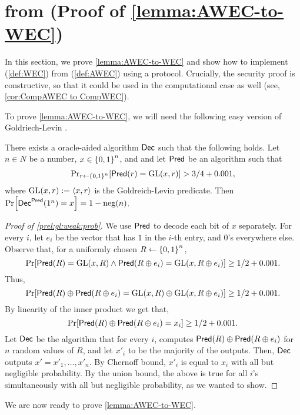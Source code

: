 \section{\WEC from \AWEC (Proof of \cref{lemma:AWEC-to-WEC})}\label{sec:AWEC-to-WEC}


In this section, we prove \cref{lemma:AWEC-to-WEC} and  show how to implement \WEC (\cref{def:WEC}) from \AWEC (\cref{def:AWEC}) using a \ppt protocol. Crucially, the security proof is constructive, so that it could be used in the computational case as well (see, \cref{cor:CompAWEC to CompWEC}).




To prove \cref{lemma:AWEC-to-WEC}, we will need the following easy version of Goldriech-Levin \cite{GoldreichL89}.
\begin{lemma}
\label{prel:gl:weak:prob}
There exists a \ppt oracle-aided  algorithm $\mathsf{Dec}$ such that the following holds. Let $n\in N$ be a number, $x\in \zn$, and %
 and let $\mathsf{Pred}$ be an algorithm such that
\begin{align*}
\ppr{ r\gets \zn}{\Pred(r)=\GL(x,r)} > 3/4+0.001,
\end{align*}
 where $\operatorname{GL}(x,r):= \langle x,r \rangle$ is the Goldreich-Levin predicate. 
Then $\pr{\Dec^\Pred(1^n)=x}=1-\negl(n)$.
\end{lemma}
\begin{proof}[Proof of \cref{prel:gl:weak:prob}]
We use $\mathsf{Pred}$ to decode each bit of $x$ separately. For every $i$, let $e_i$ be the vector that has $1$ in the $i$-th entry, and $0$'s everywhere else. Observe that, for a uniformly chosen $R\gets \zn$, 
$$\pr{\Pred(R)=\GL(x,R) \land \Pred(R\xor e_i)=\GL(x,R\xor e_i)}\ge 1/2+0.001.$$
Thus,
$$\pr{\Pred(R)\xor\Pred(R\xor e_i) =\GL(x,R) \xor \GL(x,R\xor e_i)}\ge 1/2+0.001.$$
By linearity of the inner product we get that,
$$\pr{\Pred(R)\xor\Pred(R\xor e_i) =x_i}\ge 1/2+0.001.$$
Let $\mathsf{Dec}$ be the algorithm that for every $i$, computes $\mathsf{Pred}(R)\oplus\mathsf{Pred}(R\oplus e_i)$  for $n$ random values of $R$, and let $x'_i$ to be the majority of the outputs. Then, $\mathsf{Dec}$ outputs $x'=x'_1,\dots,x'_n$. By Chernoff bound, $x'_i$ is equal to $x_i$ with all but negligible probability. By the union bound, the above is true for all $i$'s simultaneously  with all but negligible probability, as we wanted to show.
\end{proof}
We are now ready to prove \cref{lemma:AWEC-to-WEC}.

